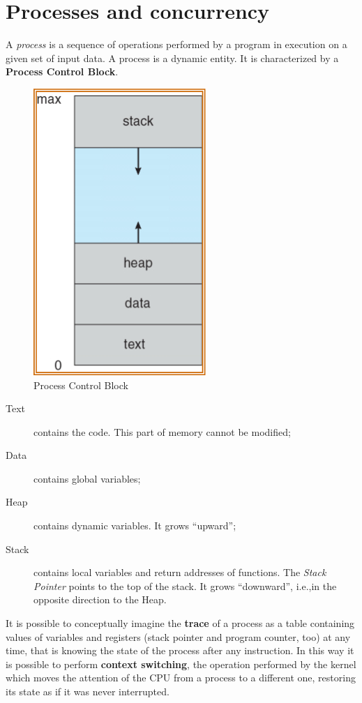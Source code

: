 \chapter{Processes and concurrency}
A \emph{process} is a sequence of operations performed by a program in execution on a given set of input data. A process is a dynamic entity. It is characterized by a \textbf{Process Control Block}.

\begin{figure}[hbtp]
\centering
\includegraphics[scale=0.3]{images/processes_concurrency/pcb.jpg}
\caption{Process Control Block}
\end{figure}
\begin{description}
\item [Text] contains the code. This part of memory cannot be modified;
\item [Data] contains global variables;
\item [Heap] contains dynamic variables. It grows ``upward'';
\item [Stack] contains local variables and return addresses of functions. The \emph{Stack Pointer} points to the top of the stack. It grows ``downward'', i.e.,\@ in the opposite direction to the Heap.
\end{description}

It is possible to conceptually imagine the \textbf{trace} of a process as a table containing values of variables and registers (stack pointer and program counter, too) at any time, that is knowing the state of the process after any instruction. In this way it is possible to perform \textbf{context switching}, the operation performed by the kernel which moves the attention of the CPU from a process to a different one, restoring its state as if it was never interrupted.

